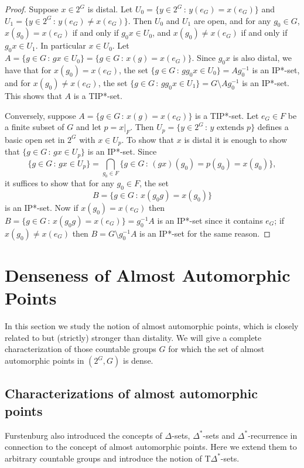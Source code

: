 \documentclass[11pt]{amsart}
\theoremstyle{definition}
\numberwithin{equation}{section}
\theoremstyle{definition}
\begin{document}
\begin{proof} Suppose $x\in 2^G$ is distal. Let $U_0=\{y\in 2^G\,:\, y(e_G)=x(e_G)\}$ and $U_1=\{y\in 2^G\,:\, y(e_G)\neq x(e_G)\}$. Then $U_0$ and $U_1$ are open, and for any $g_0\in G$, $x(g_0)=x(e_G)$ if and only if $g_0x\in U_0$, and $x(g_0)\neq x(e_G)$ if and only if $g_0x\in U_1$. In particular $x\in U_0$. Let $A=\{g\in G\,:\, gx\in U_0\}=\{g\in G\,:\, x(g)=x(e_G)\}$. Since $g_0x$ is also distal, we have that for $x(g_0)=x(e_G)$, the set $\{g\in G\,:\, gg_0x\in U_0\}=Ag_0^{-1}$ is an IP*-set, and for $x(g_0)\neq x(e_G)$, the set $\{g\in G\,:\, gg_0x\in U_1\}=G\setminus Ag_0^{-1}$ is an IP*-set. This shows that $A$ is a TIP*-set.

Conversely, suppose $A=\{g\in G\,:\, x(g)=x(e_G)\}$ is a TIP*-set. Let $e_G\in F$ be a finite subset of $G$ and let $p=x|_F$. Then $U_p=\{y\in 2^G\,:\, \mbox{$y$ extends $p$}\}$ defines a basic open set in $2^G$ with $x\in U_p$. To show that $x$ is distal it is enough to show that $\{g\in G\,:\, gx\in U_p\}$ is an IP*-set. Since
$$ \{g\in G\,:\, gx\in U_p\}=\bigcap_{g_0\in F}\{g\in G\,:\, (gx)(g_0)=p(g_0)=x(g_0)\}, $$
it suffices to show that for any $g_0\in F$, the set
$$ B=\{g\in G\,:\, x(g_0g)=x(g_0)\} $$
is an IP*-set. Now if $x(g_0)=x(e_G)$ then $B=\{g\in G\,:\, x(g_0g)=x(e_G)\}=g_0^{-1}A$ is an IP*-set since it contains $e_G$; if $x(g_0)\neq x(e_G)$ then $B=G\setminus g_0^{-1}A$ is an IP*-set for the same reason.
\end{proof}



\section{Denseness of Almost Automorphic Points\label{sec:3}}

In this section we study the notion of almost automorphic points, which is closely related to but (strictly) stronger than distality. We will give a complete characterization of those countable groups $G$ for which the set of almost automorphic points in $(2^G, G)$ is dense. 

\subsection{Characterizations of almost automorphic points}

Furstenburg \cite{Fur} also introduced the concepts of $\Delta$-sets, $\Delta^*$-sets and $\Delta^*$-recurrence in connection to the concept of almost automorphic points. Here we extend them to arbitrary countable groups and introduce the notion of T$\Delta^*$-sets.
\end{document}
